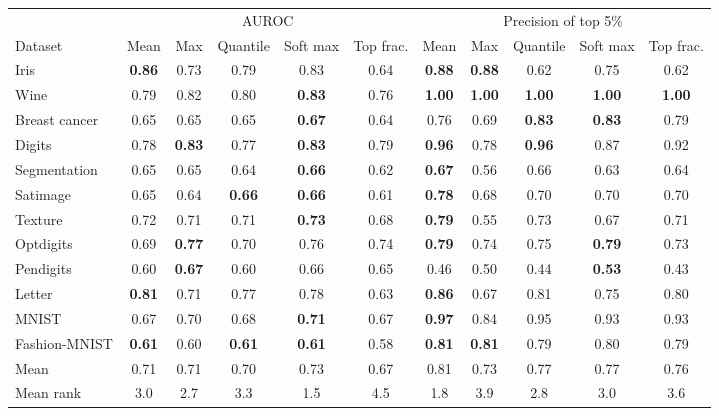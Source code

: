 \begin{tabular}{@{}lcccccccccc@{}}
\toprule
 & \multicolumn{5}{c}{AUROC} & \multicolumn{5}{c}{Precision of top 5\%} \\
\cmidrule(lr){2-6}\cmidrule(lr){7-11}
Dataset & Mean & Max & Quantile & Soft max & Top frac. & Mean & Max & Quantile & Soft max & Top frac. \\
\midrule
Iris & \textbf{0.86} & 0.73 & 0.79 & 0.83 & 0.64 & \textbf{0.88} & \textbf{0.88} & 0.62 & 0.75 & 0.62 \\
Wine & 0.79 & 0.82 & 0.80 & \textbf{0.83} & 0.76 & \textbf{1.00} & \textbf{1.00} & \textbf{1.00} & \textbf{1.00} & \textbf{1.00} \\
Breast cancer & 0.65 & 0.65 & 0.65 & \textbf{0.67} & 0.64 & 0.76 & 0.69 & \textbf{0.83} & \textbf{0.83} & 0.79 \\
Digits & 0.78 & \textbf{0.83} & 0.77 & \textbf{0.83} & 0.79 & \textbf{0.96} & 0.78 & \textbf{0.96} & 0.87 & 0.92 \\
Segmentation & 0.65 & 0.65 & 0.64 & \textbf{0.66} & 0.62 & \textbf{0.67} & 0.56 & 0.66 & 0.63 & 0.64 \\
Satimage & 0.65 & 0.64 & \textbf{0.66} & \textbf{0.66} & 0.61 & \textbf{0.78} & 0.68 & 0.70 & 0.70 & 0.70 \\
Texture & 0.72 & 0.71 & 0.71 & \textbf{0.73} & 0.68 & \textbf{0.79} & 0.55 & 0.73 & 0.67 & 0.71 \\
Optdigits & 0.69 & \textbf{0.77} & 0.70 & 0.76 & 0.74 & \textbf{0.79} & 0.74 & 0.75 & \textbf{0.79} & 0.73 \\
Pendigits & 0.60 & \textbf{0.67} & 0.60 & 0.66 & 0.65 & 0.46 & 0.50 & 0.44 & \textbf{0.53} & 0.43 \\
Letter & \textbf{0.81} & 0.71 & 0.77 & 0.78 & 0.63 & \textbf{0.86} & 0.67 & 0.81 & 0.75 & 0.80 \\
MNIST & 0.67 & 0.70 & 0.68 & \textbf{0.71} & 0.67 & \textbf{0.97} & 0.84 & 0.95 & 0.93 & 0.93 \\
Fashion-MNIST & \textbf{0.61} & 0.60 & \textbf{0.61} & \textbf{0.61} & 0.58 & \textbf{0.81} & \textbf{0.81} & 0.79 & 0.80 & 0.79 \\
\midrule
Mean & 0.71 & 0.71 & 0.70 & 0.73 & 0.67 & 0.81 & 0.73 & 0.77 & 0.77 & 0.76 \\
Mean rank & 3.0 & 2.7 & 3.3 & 1.5 & 4.5 & 1.8 & 3.9 & 2.8 & 3.0 & 3.6 \\
\bottomrule
\end{tabular}
